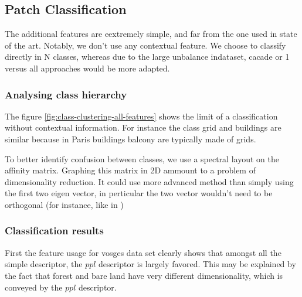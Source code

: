 	\subsection{Patch Classification}
		The additional features are eextremely simple, and far from the one used in state of the art.
		Notably, we don't use any contextual feature.
		We choose to classify directly in N classes, whereas due to the large unbalance indataset, cacade or 1 versus all approaches would be more adapted.
		
	\subsubsection{Analysing class hierarchy} 
		The figure \ref{fig:class-clustering-all-features} shows the limit of a classification without contextual information. For instance the class grid and buildings are similar because in Paris buildings balcony are typically made of grids.
		
		To better identify confusion between classes, we use a spectral layout on the affinity matrix.
		Graphing this matrix in 2D ammount to a problem of dimensionality reduction.
		It could use more advanced method than simply using the first two eigen vector,
		in perticular the two vector wouldn't need to be orthogonal (for instance, like in \cite{Hyvarinen2000})
				 
	\subsubsection{Classification results}
		  First the feature usage for vosges data set clearly shows that amongst all the simple descriptor, the $ppl$ descriptor is largely favored.
		  This may be explained by the fact that forest and bare land have very different dimensionality, which is conveyed by the $ppl$ descriptor.
		  
